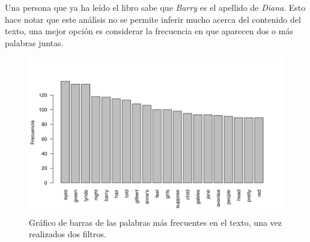 \documentclass[12pt]{article}
\begin{document}
	Una persona que ya ha leído el libro sabe que \textit{Barry} es el apellido de \textit{Diana}. Esto hace notar que este análisis no se permite inferir mucho acerca del contenido del texto, una mejor opción es considerar la frecuencia en que aparecen dos o más palabras juntas.
	
	
	\begin{figure}
		\centering
		\includegraphics[scale=0.7]{palabras_decreciente_log3.png}
		\caption{Gráfico de barras de las palabras más frecuentes en el texto, una vez realizados dos filtros.}
		\label{palabras_dec}
	\end{figure}


\end{document}
